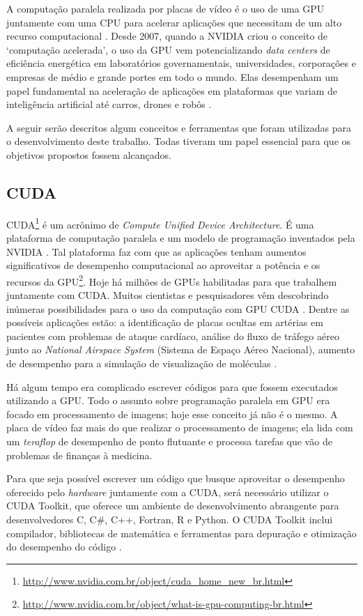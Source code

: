 \documentclass[
	12pt,				%
	twoside,			%
	a4paper,			%
	english,			%
	french,				%
	spanish,			%
	brazil				%
	]{abntex2}
\begin{document}
A computação paralela realizada por placas de vídeo é o uso de uma GPU
juntamente com uma CPU para acelerar aplicações que necessitam de um
alto recurso computacional \cite{KIRK}. Desde 2007, quando a NVIDIA
criou o conceito de `computação acelerada', o uso da GPU vem
potencializando \emph{data centers} de eficiência energética em
laboratórios governamentais, universidades, corporações e empresas de
médio e grande portes em todo o mundo. Elas desempenham um papel
fundamental na aceleração de aplicações em plataformas que variam de
inteligência artificial até carros, drones e robôs \cite{NVIDIA}.

A seguir serão descritos algum conceitos e ferramentas que foram
utilizadas para o desenvolvimento deste trabalho. Todas tiveram um papel
essencial para que os objetivos propostos fossem alcançados.

\subsection{CUDA}\label{cuda}

CUDA\footnote{\url{http://www.nvidia.com.br/object/cuda_home_new_br.html}}
é um acrônimo de \emph{Compute Unified Device Architecture}. É uma
plataforma de computação paralela e um modelo de programação inventados
pela NVIDIA \cite{NVIDIA}. Tal plataforma faz com que as aplicações
tenham aumentos significativos de desempenho computacional ao aproveitar
a potência e os recursos da GPU\footnote{\url{http://www.nvidia.com.br/object/what-is-gpu-computing-br.html}}.
Hoje há milhões de GPUs habilitadas para que trabalhem juntamente com
CUDA. Muitos cientistas e pesquisadores vêm descobrindo inúmeras
possibilidades para o uso da computação com GPU CUDA . Dentre as
possíveis aplicações estão: a identificação de placas ocultas em
artérias em pacientes com problemas de ataque cardíaco, análise do fluxo
de tráfego aéreo junto ao \emph{National Airspace System} (Sistema de
Espaço Aéreo Nacional), aumento de desempenho para a simulação de
visualização de moléculas \cite{KIRK}.

Há algum tempo era complicado escrever códigos para que fossem
executados utilizando a GPU. Todo o assunto sobre programação paralela
em GPU era focado em processamento de imagens; hoje esse conceito já não
é o mesmo. A placa de vídeo faz mais do que realizar o processamento de
imagens; ela lida com um \emph{teraflop} de desempenho de ponto
flutuante e processa tarefas que vão de problemas de finanças à
medicina.

Para que seja possível escrever um código que busque aproveitar o
desempenho oferecido pelo \emph{hardware} juntamente com a CUDA, será
necessário utilizar o CUDA Toolkit, que oferece um ambiente de
desenvolvimento abrangente para desenvolvedores C, C\#, C++, Fortran, R
e Python. O CUDA Toolkit inclui compilador, bibliotecas de matemática e
ferramentas para depuração e otimização do desempenho do código
\cite{FARBER}.
\end{document}
